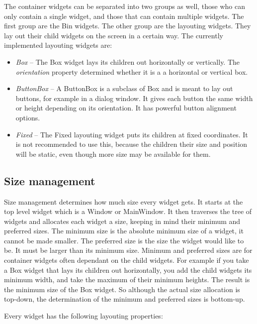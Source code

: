 \documentclass[11pt,a4paper]{article}
\begin{document}
The container widgets can be separated into two groups as well, those who can only contain a single widget, and those that can contain multiple widgets.
The first group are the Bin widgets.
The other group are the layouting widgets.
They lay out their child widgets on the screen in a certain way.
The currently implemented layouting widgets are:

\begin{itemize}
\item \textit{Box} -- The Box widget lays its children out horizontally or vertically.
The \textit{orientation} property determined whether it is a a horizontal or vertical box.

\item \textit{ButtonBox} -- A ButtonBox is a subclass of Box and is meant to lay out buttons, for example in a dialog window.
It gives each button the same width or height depending on its orientation.
It has powerful button alignment options.

\item \textit{Fixed} -- The Fixed layouting widget puts its children at fixed coordinates.
It is not recommended to use this, because the children their size and position will be static, even though more size may be available for them.
\end{itemize}

\subsection{Size management}

Size management determines how much size every widget gets.
It starts at the top level widget which is a Window or MainWindow.
It then traverses the tree of widgets and allocates each widget a size, keeping in mind their minimum and preferred sizes.
The minimum size is the absolute minimum size of a widget, it cannot be made smaller.
The preferred size is the size the widget would like to be.
It must be larger than its minimum size.
Minimum and preferred sizes are for container widgets often dependant on the child widgets.
For example if you take a Box widget that lays its children out horizontally, you add the child widgets its minimum width, and take the maximum of their minimum heights.
The result is the minimum size of the Box widget.
So although the actual size allocation is top-down, the determination of the minimum and preferred sizes is bottom-up.

Every widget has the following layouting properties:
\end{document}
